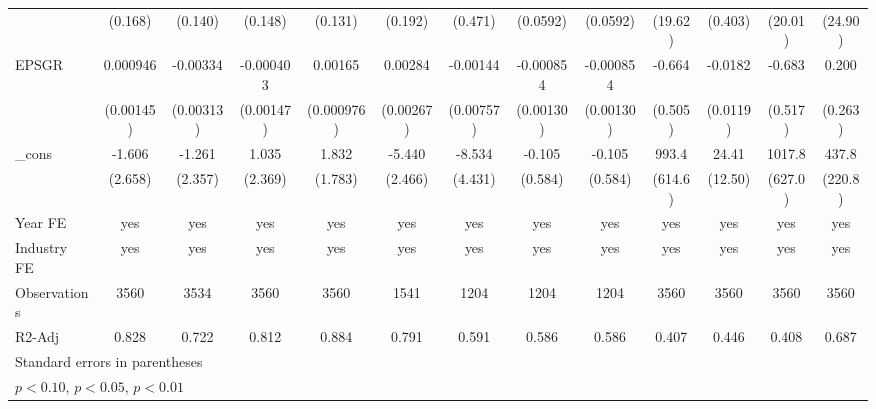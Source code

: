 \begin{table}[htbp]
\begin{tabular}{l*{12}{c}}
                    &     (0.168)         &     (0.140)         &     (0.148)         &     (0.131)         &     (0.192)         &     (0.471)         &    (0.0592)         &    (0.0592)         &     (19.62)         &     (0.403)         &     (20.01)         &     (24.90)         \\
EPSGR               &    0.000946         &    -0.00334         &   -0.000403         &     0.00165         &     0.00284         &    -0.00144         &   -0.000854         &   -0.000854         &      -0.664         &     -0.0182         &      -0.683         &       0.200         \\
                    &   (0.00145)         &   (0.00313)         &   (0.00147)         &  (0.000976)         &   (0.00267)         &   (0.00757)         &   (0.00130)         &   (0.00130)         &     (0.505)         &    (0.0119)         &     (0.517)         &     (0.263)         \\
\_cons              &      -1.606         &      -1.261         &       1.035         &       1.832         &      -5.440\sym{**} &      -8.534\sym{*}  &      -0.105         &      -0.105         &       993.4         &       24.41\sym{*}  &      1017.8         &       437.8\sym{*}  \\
                    &     (2.658)         &     (2.357)         &     (2.369)         &     (1.783)         &     (2.466)         &     (4.431)         &     (0.584)         &     (0.584)         &     (614.6)         &     (12.50)         &     (627.0)         &     (220.8)         \\
\hline
Year FE             &         yes         &         yes         &         yes         &         yes         &         yes         &         yes         &         yes         &         yes         &         yes         &         yes         &         yes         &         yes         \\
Industry FE         &         yes         &         yes         &         yes         &         yes         &         yes         &         yes         &         yes         &         yes         &         yes         &         yes         &         yes         &         yes         \\
Observations        &        3560         &        3534         &        3560         &        3560         &        1541         &        1204         &        1204         &        1204         &        3560         &        3560         &        3560         &        3560         \\
R2-Adj              &       0.828         &       0.722         &       0.812         &       0.884         &       0.791         &       0.591         &       0.586         &       0.586         &       0.407         &       0.446         &       0.408         &       0.687         \\
\hline\hline
\multicolumn{13}{l}{\footnotesize Standard errors in parentheses}\\
\multicolumn{13}{l}{\footnotesize \sym{*} \(p<0.10\), \sym{**} \(p<0.05\), \sym{***} \(p<0.01\)}\\
\end{tabular}
\end{table}
